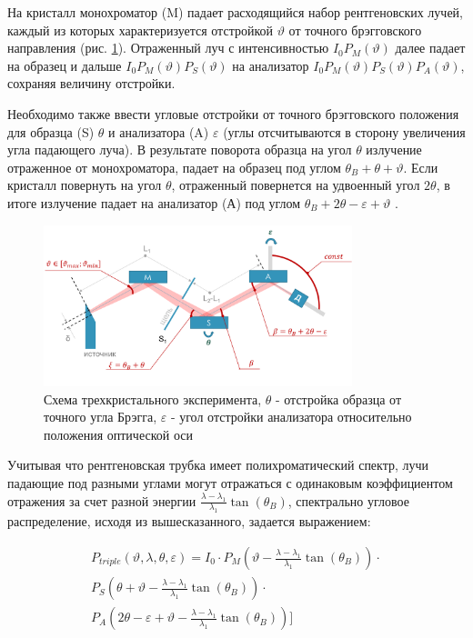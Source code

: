 На кристалл монохроматор (M) падает расходящийся набор рентгеновских лучей, каждый из которых характеризуется отстройкой
$\vartheta$ от точного брэгговского направления (рис. \ref{ris:triple_crystal_schem}). Отраженный луч с интенсивностью
$I_0 P_M(\vartheta)$ далее падает на образец и дальше $I_0 P_M(\vartheta)P_S(\vartheta)$  на анализатор $I_0 P_M(\vartheta)P_S(\vartheta)P_A(\vartheta)$,
сохраняя величину отстройки.

Необходимо также ввести угловые отстройки от точного брэгговского положения
для образца (S) $\theta$ и анализатора (A) $\varepsilon$  (углы отсчитываются в сторону увеличения угла падающего луча).
В результате поворота образца на угол  $\theta$ излучение отраженное от монохроматора, падает на образец
под углом $\theta_B+\theta+\vartheta$. Если кристалл повернуть на угол $\theta$, отраженный повернется на удвоенный угол
$2\theta$, в итоге излучение падает на анализатор (А) под углом $\theta_B+2\theta-\varepsilon+\vartheta$ \cite{trd_Bushuev_1997}.
\begin{figure}[H]
  \centering
  \includegraphics[width=0.8\textwidth]{images/triple_crystal_schem.png}
  \caption{Схема трехкристального эксперимента, $\theta$ - отстройка образца от точного угла Брэгга,
  $\varepsilon$ - угол отстройки анализатора относительно положения оптической оси}
  \label{ris:triple_crystal_schem}
\end{figure}

Учитывая что рентгеновская трубка имеет полихроматический спектр, лучи падающие под разными углами могут отражаться
с одинаковым коэффициентом отражения за счет разной энергии $\frac{\lambda - \lambda_1}{\lambda_1}\tan(\theta_B)$,
спектрально угловое распределение, исходя из вышесказанного, задается выражением:

\begin{eqnarray} \label{eq:triplr_spectra_angle_map}
  P_{triple}(\vartheta,\lambda,\theta,\varepsilon) =I_0\cdot
    P_M \left(\vartheta - \frac{\lambda - \lambda_1}{\lambda_1}\tan(\theta_B) \right) \cdot \nonumber \\
   P_S \left(\theta + \vartheta - \frac{\lambda - \lambda_1}{\lambda_1}\tan(\theta_B)\right)  \cdot  \nonumber \\
   P_A \left(2\theta - \varepsilon + \vartheta - \frac{\lambda - \lambda_1}{\lambda_1}\tan(\theta_B)\right) \Bigg]
 \end{eqnarray}

